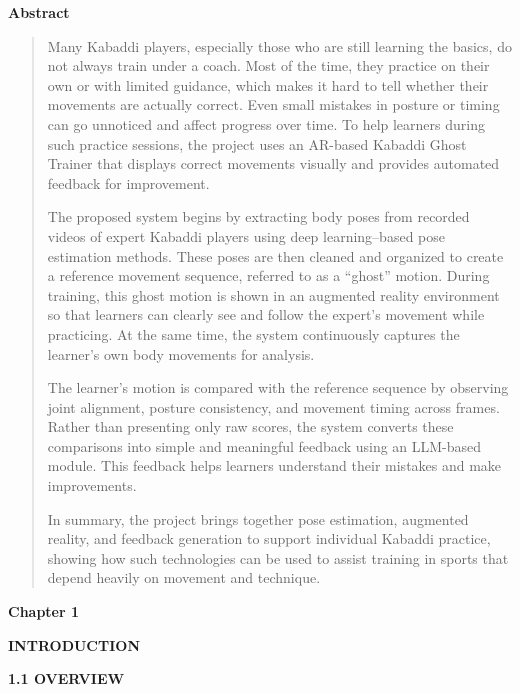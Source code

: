 \documentclass[
]{article}
\author{}
\date{}
\begin{document}
\textbf{Abstract}

\begin{quote}
Many Kabaddi players, especially those who are still learning the
basics, do not always train under a coach. Most of the time, they
practice on their own or with limited guidance, which makes it hard to
tell whether their movements are actually correct. Even small mistakes
in posture or timing can go unnoticed and affect progress over time. To
help learners during such practice sessions, the project uses an
AR-based Kabaddi Ghost Trainer that displays correct movements visually
and provides automated feedback for improvement.

The proposed system begins by extracting body poses from recorded videos
of expert Kabaddi players using deep learning--based pose estimation
methods. These poses are then cleaned and organized to create a
reference movement sequence, referred to as a ``ghost'' motion. During
training, this ghost motion is shown in an augmented reality environment
so that learners can clearly see and follow the expert's movement while
practicing. At the same time, the system continuously captures the
learner's own body movements for analysis.

The learner's motion is compared with the reference sequence by
observing joint alignment, posture consistency, and movement timing
across frames. Rather than presenting only raw scores, the system
converts these comparisons into simple and meaningful feedback using an
LLM-based module. This feedback helps learners understand their mistakes
and make improvements.

In summary, the project brings together pose estimation, augmented
reality, and feedback generation to support individual Kabaddi practice,
showing how such technologies can be used to assist training in sports
that depend heavily on movement and technique.
\end{quote}

\textbf{Chapter 1}

\textbf{INTRODUCTION}

\textbf{1.1 OVERVIEW}
\end{document}
